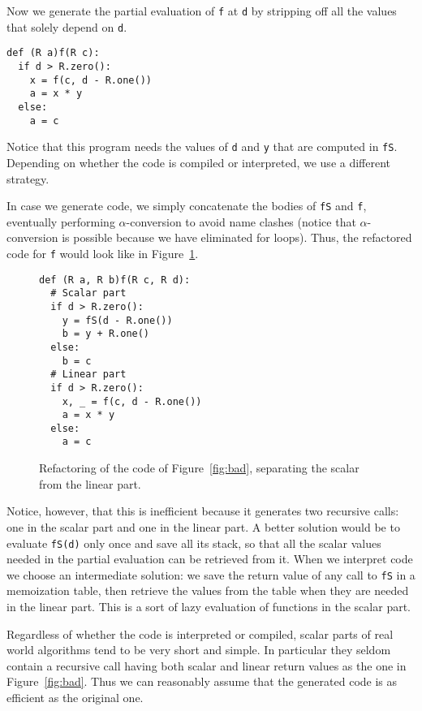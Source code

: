 \ifafive\enlargethispage{-\baselineskip}\fi
Now we generate the partial evaluation of \lstinline+f+ at
\lstinline+d+ by stripping off all the values that solely depend on
\lstinline+d+.
\begin{lstlisting}
def (R a)f(R c):
  if d > R.zero():
    x = f(c, d - R.one())
    a = x * y
  else:
    a = c
\end{lstlisting}
Notice that this program needs the values of \lstinline+d+ and
\lstinline+y+ that are computed in \lstinline+fS+. Depending on
whether the code is compiled or interpreted, we use a different
strategy.

In case we generate code, we simply concatenate the bodies of
\lstinline+fS+ and \lstinline+f+, eventually performing
$\alpha$-conversion to avoid name clashes (notice that
$\alpha$-conversion is possible because we have eliminated for
loops). Thus, the refactored code for \lstinline+f+ would look like in
Figure~\ref{fig:bad-ref}.

\begin{figure}[t]
  \centering
\begin{lstlisting}
def (R a, R b)f(R c, R d):
  # Scalar part
  if d > R.zero():
    y = fS(d - R.one())
    b = y + R.one()
  else:
    b = c
  # Linear part
  if d > R.zero():
    x, _ = f(c, d - R.one())
    a = x * y
  else:
    a = c
\end{lstlisting}
  \caption{\label{fig:bad-ref}Refactoring of the code of
    Figure~\ref{fig:bad}, separating the scalar from the linear part.}
\end{figure}


Notice, however, that this is inefficient because it generates two
recursive calls: one in the scalar part and one in the linear part. A
better solution would be to evaluate \lstinline+fS(d)+ only once and
save all its stack, so that all the scalar values needed in the
partial evaluation can be retrieved from it. When we interpret code we
choose an intermediate solution: we save the return value of any call
to \lstinline+fS+ in a memoization table, then retrieve the values
from the table when they are needed in the linear part. This is a sort
of lazy evaluation of functions in the scalar part.

\ifafive\enlargethispage{-\baselineskip}\fi
\begin{remark}
  Regardless of whether the code is interpreted or compiled, scalar
  parts of real world algorithms tend to be very short and simple. In
  particular they seldom contain a recursive call having both scalar
  and linear return values as the one in Figure~\ref{fig:bad}. Thus we
  can reasonably assume that the generated code is as efficient as the
  original one.
\end{remark}

